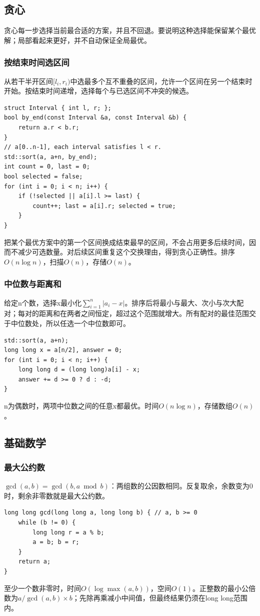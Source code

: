\subsection{贪心}
贪心每一步选择当前最合适的方案，并且不回退。要说明这种选择能保留某个最优解；局部看起来更好，并不自动保证全局最优。
\subsubsection{按结束时间选区间}
从若干半开区间$[l_i,r_i)$中选最多个互不重叠的区间，允许一个区间在另一个结束时开始。按结束时间递增，选择每个与已选区间不冲突的候选。
\begin{lstlisting}
struct Interval { int l, r; };
bool by_end(const Interval &a, const Interval &b) {
    return a.r < b.r;
}
// a[0..n-1], each interval satisfies l < r.
std::sort(a, a+n, by_end);
int count = 0, last = 0;
bool selected = false;
for (int i = 0; i < n; i++) {
    if (!selected || a[i].l >= last) {
        count++; last = a[i].r; selected = true;
    }
}
\end{lstlisting}
把某个最优方案中的第一个区间换成结束最早的区间，不会占用更多后续时间，因而不减少可选数量。对后续区间重复这个交换理由，得到贪心正确性。排序$O(n\log n)$，扫描$O(n)$，存储$O(n)$。
\subsubsection{中位数与距离和}
给定n个数，选择x最小化$\sum_{i=1}^n|a_i-x|$。排序后将最小与最大、次小与次大配对；每对的距离和在两者之间恒定，超过这个范围就增大。所有配对的最佳范围交于中位数处，所以任选一个中位数即可。
\begin{lstlisting}
std::sort(a, a+n);
long long x = a[n/2], answer = 0;
for (int i = 0; i < n; i++) {
    long long d = (long long)a[i] - x;
    answer += d >= 0 ? d : -d;
}
\end{lstlisting}
n为偶数时，两项中位数之间的任意x都最优。时间$O(n\log n)$，存储数组$O(n)$。

\subsection{基础数学}
\subsubsection{最大公约数}
$\gcd(a,b)=\gcd(b,a\bmod b)$：两组数的公因数相同。反复取余，余数变为0时，剩余非零数就是最大公约数。
\begin{lstlisting}
long long gcd(long long a, long long b) { // a, b >= 0
    while (b != 0) {
        long long r = a % b;
        a = b; b = r;
    }
    return a;
}
\end{lstlisting}
至少一个数非零时，时间$O(\log\max(a,b))$，空间$O(1)$。正整数的最小公倍数为$a/\gcd(a,b)\times b$；先除再乘减小中间值，但最终结果仍须在long long范围内。

